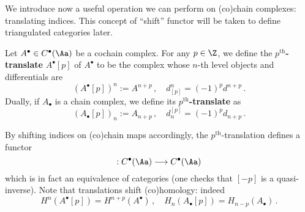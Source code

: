 We introduce now a useful operation we can perform on (co)chain complexes:
translating indices. This concept of ``shift'' functor will be 
taken to define triangulated categories later.

\begin{df}
    Let $A^{\bullet} \in C^{\bullet}(\Aa)$ be a cochain complex. 
    For any $p \in \Z$, we define the \textbf{$p^{\text{th}}$-translate}
    $A^{\bullet}[p]$ of $A^{\bullet}$ to be the complex whose $n$-th level
    objects and differentials are
    \begin{equation*}
        (A^{\bullet}[p])^{n} := A^{n+p}\,, \quad d_{[p]}^{n} = (-1)^{p}d^{n+p}\,.
    \end{equation*}
    Dually, if $A_{\bullet}$ is a chain complex,
    we define its \textbf{$p^{\text{th}}$-translate} as
    \begin{equation*}
        (A_{\bullet}[p])_{n} := A_{n+p}\,, \quad d^{[p]}_{n} = (-1)^{p}d_{n+p}\,.
    \end{equation*}
\end{df}

By shifting indices on (co)chain maps accordingly,
the $p^{\text{th}}$-translation defines a functor
\begin{equation*}
    [p] : C^{\bullet}(\Aa) \longrightarrow C^{\bullet}(\Aa)
\end{equation*}
which is in fact an equivalence of categories
(one checks that $[-p]$ is a quasi-inverse).
Note that translations shift (co)homology: indeed
\begin{equation}\label{shift-coh}
    H^{n}(A^{\bullet}[p]) = H^{n+p}(A^{\bullet})\,,
    \quad H_{n}(A_{\bullet}[p]) = H_{n-p}(A_{\bullet})\,.
\end{equation}

